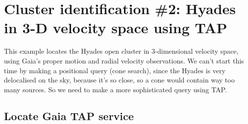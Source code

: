 \documentclass{article}
\begin{document}
\newpage

\section{Cluster identification \#2: Hyades in 3-D velocity space using TAP}
\label{sec:cluster3d}

This example locates the Hyades open cluster in 3-dimensional velocity space,
using Gaia's proper motion and radial velocity observations.
We can't start this time by making a positional query (cone search),
since the Hyades is very delocalised on the sky, because it's so close,
so a cone would contain way too many sources.
So we need to make a more sophisticated query using TAP.

\vspace*{-0.3cm}
\subsection{Locate Gaia TAP service}
\vspace*{-0.2cm}
\end{document}
